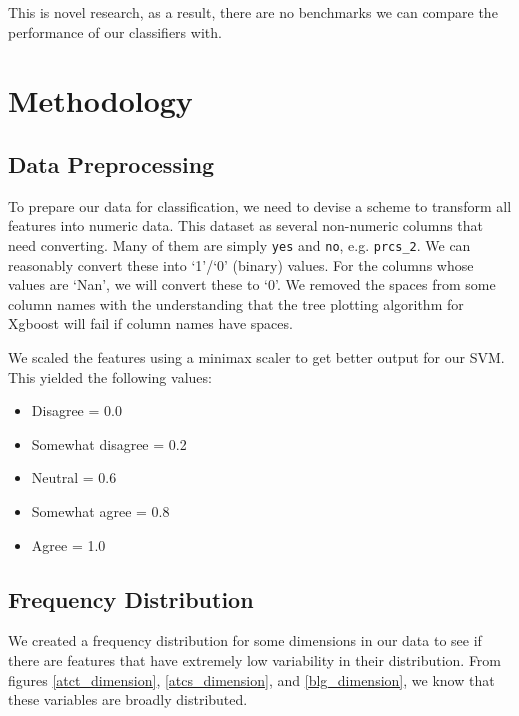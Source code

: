 This is novel research, as a result, there are no benchmarks we can compare the performance of our classifiers with.


\chapter*{Methodology}


\section*{Data Preprocessing}

To prepare our data for classification, we need to devise a scheme to transform all features into numeric data. This dataset as several non-numeric columns that need converting. Many of them are simply \texttt{yes} and \texttt{no}, e.g. \texttt{prcs\_2}. We can reasonably convert these into `1'/`0' (binary) values. For the columns whose values are `Nan', we will convert these to `0'. We removed the spaces from some column names with the understanding that the tree plotting algorithm for Xgboost will fail if column names have spaces. 

We scaled the features using a minimax scaler to get better output for our SVM. This yielded the following values:
\begin {itemize}
\item Disagree = 0.0
\item Somewhat disagree = 0.2
\item Neutral = 0.6
\item Somewhat agree = 0.8
\item Agree = 1.0
\end{itemize} 



\section*{Frequency Distribution}
We created a frequency distribution for some dimensions in our data to see if there are features that have extremely low variability in their distribution. From figures \ref{atct_dimension}, \ref{atcs_dimension}, and \ref{blg_dimension}, we know that these variables are broadly distributed.


